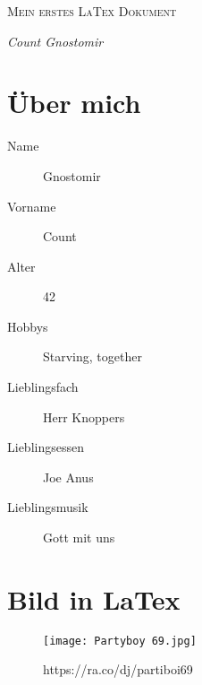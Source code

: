 \documentclass[12pt, a4paper]{article} %
\begin{document}

\thispagestyle{empty}

\begin{title}
	
	\vspace{5cm}
	
	{\scshape\Huge Mein erstes LaTex Dokument \par}

	\vspace{5cm}
	{\Large\itshape Count Gnostomir \par} %
	

\end{title}

\newpage

\tableofcontents %

\newpage

\section{\"Uber mich}

\begin{description}
\item[Name]
Gnostomir
\item[Vorname]
Count
\item[Alter]
42
\item[Hobbys]
Starving, together
\item[Lieblingsfach]
Herr Knoppers
\item[Lieblingsessen]
Joe Anus 
\item[Lieblingsmusik]
Gott mit uns
\end{description}

\section{Bild in LaTex}

\begin{figure}[h]%
\centering\texttt{[image: Partyboy 69.jpg]}
\caption{https://ra.co/dj/partiboi69}
\end{figure}
\end{document}
